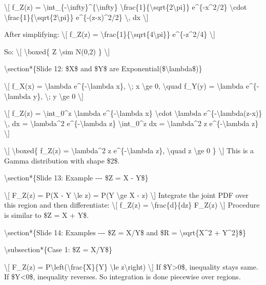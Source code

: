 \textbackslash{[} f\_Z(z) =
\textbackslash int\_\{-\textbackslash infty\}\^{}\{\textbackslash infty\}
\textbackslash frac\{1\}\{\textbackslash sqrt\{2\textbackslash pi\}\}
e\^{}\{-x\^{}2/2\} \textbackslash cdot
\textbackslash frac\{1\}\{\textbackslash sqrt\{2\textbackslash pi\}\}
e\^{}\{-(z-x)\^{}2/2\} \textbackslash, dx \textbackslash{]}

After simplifying: \textbackslash{[} f\_Z(z) =
\textbackslash frac\{1\}\{\textbackslash sqrt\{4\textbackslash pi\}\}
e\^{}\{-z\^{}2/4\} \textbackslash{]}

So: \textbackslash{[} \textbackslash boxed\{ Z \textbackslash sim N(0,2)
\} \textbackslash{]}

\textbackslash section*\{Slide 12: \$X\$ and \$Y\$ are
Exponential(\$\textbackslash lambda\$)\}

\textbackslash{[} f\_X(x) = \textbackslash lambda
e\^{}\{-\textbackslash lambda x\}, \textbackslash; x \textbackslash ge
0, \textbackslash quad f\_Y(y) = \textbackslash lambda
e\^{}\{-\textbackslash lambda y\}, \textbackslash; y \textbackslash ge 0
\textbackslash{]}

\textbackslash{[} f\_Z(z) = \textbackslash int\_0\^{}z
\textbackslash lambda e\^{}\{-\textbackslash lambda x\}
\textbackslash cdot \textbackslash lambda
e\^{}\{-\textbackslash lambda(z-x)\} \textbackslash, dx =
\textbackslash lambda\^{}2 e\^{}\{-\textbackslash lambda z\}
\textbackslash int\_0\^{}z dx = \textbackslash lambda\^{}2 z
e\^{}\{-\textbackslash lambda z\} \textbackslash{]}

\textbackslash{[} \textbackslash boxed\{ f\_Z(z) =
\textbackslash lambda\^{}2 z e\^{}\{-\textbackslash lambda z\},
\textbackslash quad z \textbackslash ge 0 \} \textbackslash{]} This is a
Gamma distribution with shape \$2\$.

\textbackslash section*\{Slide 13: Example -\/-\/- \$Z = X - Y\$\}

\textbackslash{[} F\_Z(z) = P(X - Y \textbackslash le z) = P(Y
\textbackslash ge X - z) \textbackslash{]} Integrate the joint PDF over
this region and then differentiate: \textbackslash{[} f\_Z(z) =
\textbackslash frac\{d\}\{dz\} F\_Z(z) \textbackslash{]} Procedure is
similar to \$Z = X + Y\$.

\textbackslash section*\{Slide 14: Examples -\/-\/- \$Z = X/Y\$ and \$R
= \textbackslash sqrt\{X\^{}2 + Y\^{}2\}\$\}

\textbackslash subsection*\{Case 1: \$Z = X/Y\$\}

\textbackslash{[} F\_Z(z) =
P\textbackslash left(\textbackslash frac\{X\}\{Y\} \textbackslash le
z\textbackslash right) \textbackslash{]} If \$Y\textgreater0\$,
inequality stays same. If \$Y\textless0\$, inequality reverses. So
integration is done piecewise over regions.

